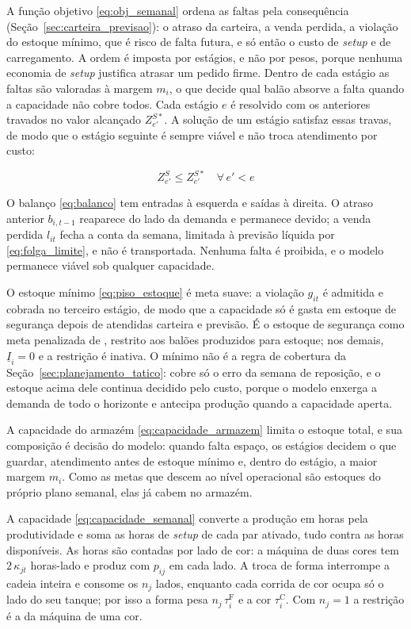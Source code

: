 \documentclass[
    12pt,
    openright,
    oneside,
    a4paper,
    fleqn,
    chapter=TITLE,
    section=TITLE,
    english,
    brazil
]{abntex2}
\begin{document}
A função objetivo \eqref{eq:obj_semanal} ordena as faltas pela consequência (Seção~\ref{sec:carteira_previsao}): o atraso da carteira, a venda perdida, a violação do estoque mínimo, que é risco de falta futura, e só então o custo de \textit{setup} e de carregamento. A ordem é imposta por estágios, e não por pesos, porque nenhuma economia de \textit{setup} justifica atrasar um pedido firme. Dentro de cada estágio as faltas são valoradas à margem $m_i$, o que decide qual balão absorve a falta quando a capacidade não cobre todos. Cada estágio $e$ é resolvido com os anteriores travados no valor alcançado $Z^{S*}_{e'}$. A solução de um estágio satisfaz essas travas, de modo que o estágio seguinte é sempre viável e não troca atendimento por custo:
\begin{ceqn}
\begin{equation}
Z^{S}_{e'} \le Z^{S*}_{e'} \quad \forall\, e' < e
\label{eq:trava}
\end{equation}
\end{ceqn}

O balanço \eqref{eq:balanco} tem entradas à esquerda e saídas à direita. O atraso anterior $b_{i,t-1}$ reaparece do lado da demanda e permanece devido; a venda perdida $l_{it}$ fecha a conta da semana, limitada à previsão líquida por \eqref{eq:folga_limite}, e não é transportada. Nenhuma falta é proibida, e o modelo permanece viável sob qualquer capacidade.

O estoque mínimo \eqref{eq:piso_estoque} é meta suave: a violação $g_{it}$ é admitida e cobrada no terceiro estágio, de modo que a capacidade só é gasta em estoque de segurança depois de atendidas carteira e previsão. É o estoque de segurança como meta penalizada de , restrito aos balões produzidos para estoque; nos demais, $\underline{I}_i = 0$ e a restrição é inativa. O mínimo não é a regra de cobertura da Seção~\ref{sec:planejamento_tatico}: cobre só o erro da semana de reposição, e o estoque acima dele continua decidido pelo custo, porque o modelo enxerga a demanda de todo o horizonte e antecipa produção quando a capacidade aperta.

A capacidade do armazém \eqref{eq:capacidade_armazem} limita o estoque total, e sua composição é decisão do modelo: quando falta espaço, os estágios decidem o que guardar, atendimento antes de estoque mínimo e, dentro do estágio, a maior margem $m_i$. Como as metas que descem ao nível operacional são estoques do próprio plano semanal, elas já cabem no armazém.

A capacidade \eqref{eq:capacidade_semanal} converte a produção em horas pela produtividade e soma as horas de \textit{setup} de cada par ativado, tudo contra as horas disponíveis. As horas são contadas por lado de cor: a máquina de duas cores tem $2\,\kappa_{jt}$ horas-lado e produz com $p_{ij}$ em cada lado. A troca de forma interrompe a cadeia inteira e consome os $n_j$ lados, enquanto cada corrida de cor ocupa só o lado do seu tanque; por isso a forma pesa $n_j\,\tau^{\mathrm{F}}_i$ e a cor $\tau^{\mathrm{C}}_i$. Com $n_j = 1$ a restrição é a da máquina de uma cor.
\end{document}
